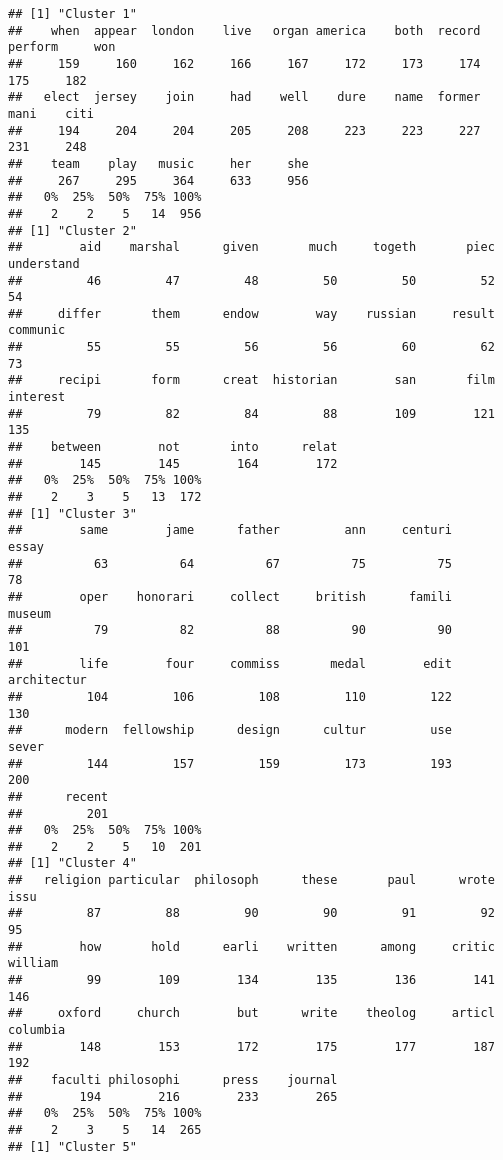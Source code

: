 \documentclass[
]{article}
\begin{document}
\begin{verbatim}
## [1] "Cluster 1"
##    when  appear  london    live   organ america    both  record perform     won 
##     159     160     162     166     167     172     173     174     175     182 
##   elect  jersey    join     had    well    dure    name  former    mani    citi 
##     194     204     204     205     208     223     223     227     231     248 
##    team    play   music     her     she 
##     267     295     364     633     956 
##   0%  25%  50%  75% 100% 
##    2    2    5   14  956 
## [1] "Cluster 2"
##        aid    marshal      given       much     togeth       piec understand 
##         46         47         48         50         50         52         54 
##     differ       them      endow        way    russian     result   communic 
##         55         55         56         56         60         62         73 
##     recipi       form      creat  historian        san       film   interest 
##         79         82         84         88        109        121        135 
##    between        not       into      relat 
##        145        145        164        172 
##   0%  25%  50%  75% 100% 
##    2    3    5   13  172 
## [1] "Cluster 3"
##        same        jame      father         ann     centuri       essay 
##          63          64          67          75          75          78 
##        oper    honorari     collect     british      famili      museum 
##          79          82          88          90          90         101 
##        life        four     commiss       medal        edit architectur 
##         104         106         108         110         122         130 
##      modern  fellowship      design      cultur         use       sever 
##         144         157         159         173         193         200 
##      recent 
##         201 
##   0%  25%  50%  75% 100% 
##    2    2    5   10  201 
## [1] "Cluster 4"
##   religion particular  philosoph      these       paul      wrote       issu 
##         87         88         90         90         91         92         95 
##        how       hold      earli    written      among     critic    william 
##         99        109        134        135        136        141        146 
##     oxford     church        but      write    theolog     articl   columbia 
##        148        153        172        175        177        187        192 
##    faculti philosophi      press    journal 
##        194        216        233        265 
##   0%  25%  50%  75% 100% 
##    2    3    5   14  265 
## [1] "Cluster 5"

\end{verbatim}
\end{document}
